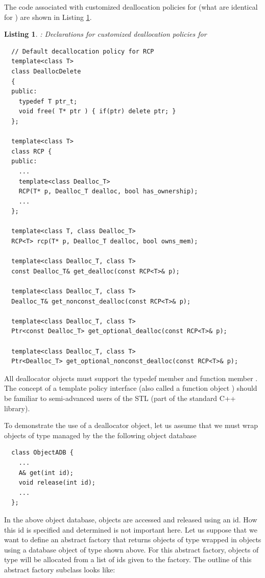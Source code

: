 \documentclass[pdf,ps2pdf,11pt]{SANDreport}
\newtheorem{listing}{Listing}
\begin{document}
The code associated with customized deallocation policies for
{} (what are identical for {}) are shown
in Listing {}\ref{listing:RCP-dealloc}.

\begin{listing}: Declarations for customized deallocation policies
for {} \\
\label{listing:RCP-dealloc}
{\small\begin{verbatim}
  // Default decallocation policy for RCP
  template<class T>
  class DeallocDelete
  {
  public:
    typedef T ptr_t;
    void free( T* ptr ) { if(ptr) delete ptr; }
  };

  template<class T>
  class RCP {
  public:
    ...
    template<class Dealloc_T>
    RCP(T* p, Dealloc_T dealloc, bool has_ownership);
    ...
  };
  
  template<class T, class Dealloc_T>
  RCP<T> rcp(T* p, Dealloc_T dealloc, bool owns_mem);
  
  template<class Dealloc_T, class T>
  const Dealloc_T& get_dealloc(const RCP<T>& p);
  
  template<class Dealloc_T, class T>
  Dealloc_T& get_nonconst_dealloc(const RCP<T>& p);
  
  template<class Dealloc_T, class T>
  Ptr<const Dealloc_T> get_optional_dealloc(const RCP<T>& p);
  
  template<class Dealloc_T, class T> 
  Ptr<Dealloc_T> get_optional_nonconst_dealloc(const RCP<T>& p);

\end{verbatim}}
\end{listing}

All deallocator objects must support the typedef member
{} and function member {}.  The concept
of a template policy interface (also called a function object
\cite[Section 18.4]{stroustrup97}) should be familiar to
semi-advanced users of the STL (part of the standard C++ library).

To demonstrate the use of a deallocator object, let us assume that we
must wrap objects of type {} managed by the the following
object database

{\small\begin{verbatim}
  class ObjectADB {
    ...
    A& get(int id);
    void release(int id);
    ...
  };
\end{verbatim}}

In the above object database, objects are accessed and released using
an id.  How this id is specified and determined is not important here.
Let us suppose that we want to define an abstract factory that returns
objects of type {} wrapped in {} objects
using a database object of type {} shown above.  For
this abstract factory, objects of type {} will be allocated
from a list of ids given to the factory.  The outline of this abstract
factory subclass looks like:
\end{document}
